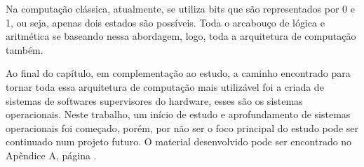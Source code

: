 Na computação clássica, atualmente, se utiliza bits que são representados por 0 e 1, ou seja, apenas dois estados são possíveis. Toda o arcabouço de lógica e aritmética se baseando nessa abordagem, logo, toda a arquitetura de computação também.

Ao final do capítulo, em complementação ao estudo, a caminho encontrado para tornar toda essa arquitetura de computação mais utilizável foi a criada de sistemas de softwares supervisores do hardware, esses são os sistemas operacionais. Neste trabalho, um início de estudo e aprofundamento de sistemas operacionais foi começado, porém, por não ser o foco principal do estudo pode ser continuado num projeto futuro. O material desenvolvido pode ser encontrado no Apêndice A, página \pageref{apendeceA}.




\newpage
